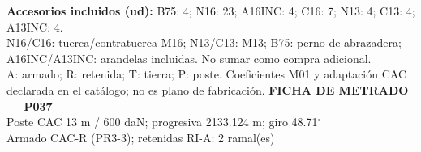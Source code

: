 \begingroup\scriptsize
\textbf{Accesorios incluidos (ud):} B75: 4; N16: 23; A16INC: 4; C16: 7; N13: 4; C13: 4; A13INC: 4.\\
N16/C16: tuerca/contratuerca M16; N13/C13: M13; B75: perno de abrazadera; A16INC/A13INC: arandelas incluidas. No sumar como compra adicional.\\
A: armado; R: retenida; T: tierra; P: poste. Coeficientes M01 y adaptación CAC declarada en el catálogo; no es plano de fabricación.
\endgroup\endgroup
\clearpage{}
\begingroup\small\setlength{\parskip}{3pt}\renewcommand{\arraystretch}{1.05}
\textbf{\large FICHA DE METRADO — P037}\\[4pt]
Poste CAC 13 m / 600 daN; progresiva 2133.124 m; giro 48.71\ensuremath{^\circ}\\
Armado CAC-R (PR3-3); retenidas RI-A: 2 ramal(es)\\
\begingroup\scriptsize
